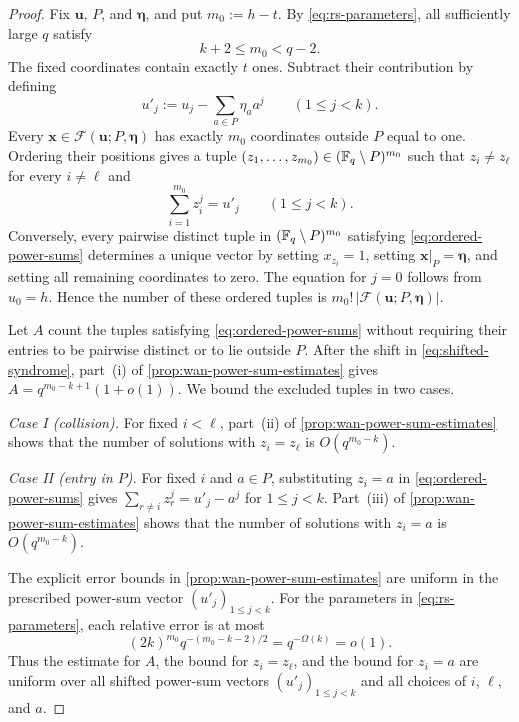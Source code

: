 \begin{proof}
Fix $\mathbf u$, $P$, and $\boldsymbol\eta$, and put $m_0:=h-t$.  By
\cref{eq:rs-parameters}, all sufficiently large $q$ satisfy
\[
 k+2\le m_0<q-2.
\]
The fixed coordinates contain exactly $t$ ones.  Subtract their contribution
by defining
\begin{equation}
\label{eq:shifted-syndrome}
 u'_j:=u_j-\sum_{a\in P}\eta_aa^j
 \qquad(1\le j<k).
\end{equation}
Every $\mathbf x\in\mathcal F(\mathbf u;P,\boldsymbol\eta)$ has exactly
$m_0$ coordinates outside $P$ equal to one.  Ordering their positions gives
a tuple $(z_1,\ldots,z_{m_0})\in(\mathbb F_q\setminus P)^{m_0}$ such that
$z_i\ne z_\ell$ for every $i\ne\ell$ and
\begin{equation}
\label{eq:ordered-power-sums}
 \sum_{i=1}^{m_0}z_i^j=u'_j
 \qquad(1\le j<k).
\end{equation}
Conversely, every pairwise distinct tuple in
$(\mathbb F_q\setminus P)^{m_0}$ satisfying \cref{eq:ordered-power-sums}
determines a unique vector by setting $x_{z_i}=1$, setting
$\mathbf x|_P=\boldsymbol\eta$, and setting all remaining coordinates to
zero.  The equation for $j=0$ follows from $u_0=h$.  Hence the number of
these ordered tuples is $m_0!\,|\mathcal F(\mathbf u;P,\boldsymbol\eta)|$.

Let $A$ count the tuples satisfying
\cref{eq:ordered-power-sums} without requiring their entries to be
pairwise distinct or to lie outside $P$.  After the shift in
\cref{eq:shifted-syndrome}, part~(i) of
\cref{prop:wan-power-sum-estimates} gives
$A=q^{m_0-k+1}(1+o(1))$.  We bound the excluded tuples in two cases.
\par\noindent
\emph{Case I (collision).}  For fixed $i<\ell$,
part~(ii) of \cref{prop:wan-power-sum-estimates} shows that
the number of solutions with
$z_i=z_\ell$ is $O(q^{m_0-k})$.
\par\noindent
\emph{Case II (entry in $P$).}  For fixed $i$ and $a\in P$, substituting
$z_i=a$ in \cref{eq:ordered-power-sums} gives
$\sum_{r\ne i}z_r^j=u'_j-a^j$ for $1\le j<k$.
Part~(iii) of \cref{prop:wan-power-sum-estimates} shows that
the number of solutions with $z_i=a$ is
$O(q^{m_0-k})$.

The explicit error bounds in
\cref{prop:wan-power-sum-estimates} are uniform in the prescribed
power-sum vector $(u'_j)_{1\le j<k}$.  For the
parameters in \cref{eq:rs-parameters}, each relative error is at
most
\[
 (2k)^{m_0}q^{-(m_0-k-2)/2}=q^{-\Omega(k)}=o(1).
\]
Thus the estimate for $A$, the bound for $z_i=z_\ell$, and the
bound for $z_i=a$ are uniform over all shifted power-sum vectors
$(u'_j)_{1\le j<k}$ and all
choices of $i$, $\ell$, and $a$.


\end{proof}
